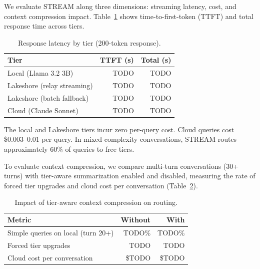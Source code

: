 \documentclass[manuscript, review]{acmart}
\begin{document}

We evaluate STREAM along three dimensions: streaming latency, cost, and context compression impact. Table~\ref{tab:latency} shows time-to-first-token (TTFT) and total response time across tiers.

\begin{table}[h]
\centering
\caption{Response latency by tier (200-token response).}
\label{tab:latency}
\small
\begin{tabular}{@{}lrr@{}}
\toprule
\textbf{Tier} & \textbf{TTFT (s)} & \textbf{Total (s)} \\
\midrule
Local (Llama 3.2 3B)          & TODO & TODO \\
Lakeshore (relay streaming)   & TODO & TODO \\
Lakeshore (batch fallback)    & TODO & TODO \\
Cloud (Claude Sonnet)         & TODO & TODO \\
\bottomrule
\end{tabular}
\end{table}

The local and Lakeshore tiers incur zero per-query cost. Cloud queries cost \$0.003--0.01 per query. In mixed-complexity conversations, STREAM routes approximately 60\% of queries to free tiers.

To evaluate context compression, we compare multi-turn conversations (30+ turns) with tier-aware summarization enabled and disabled, measuring the rate of forced tier upgrades and cloud cost per conversation (Table~\ref{tab:compression}).

\begin{table}[h]
\centering
\caption{Impact of tier-aware context compression on routing.}
\label{tab:compression}
\small
\begin{tabular}{@{}lrr@{}}
\toprule
\textbf{Metric} & \textbf{Without} & \textbf{With} \\
\midrule
Simple queries on local (turn 20+) & TODO\% & TODO\% \\
Forced tier upgrades               & TODO   & TODO \\
Cloud cost per conversation         & \$TODO & \$TODO \\
\bottomrule
\end{tabular}
\end{table}

\end{document}
